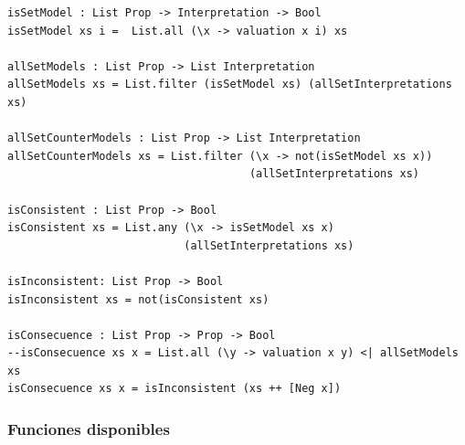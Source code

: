 \documentclass[a4paper]{report}
\begin{document}
\begin{lstlisting}[caption={Módulo SintaxSemanticsLP}, mathescape=true]
isSetModel : List Prop -> Interpretation -> Bool
isSetModel xs i =  List.all (\x -> valuation x i) xs

allSetModels : List Prop -> List Interpretation
allSetModels xs = List.filter (isSetModel xs) (allSetInterpretations xs)

allSetCounterModels : List Prop -> List Interpretation
allSetCounterModels xs = List.filter (\x -> not(isSetModel xs x)) 
                                     (allSetInterpretations xs)

isConsistent : List Prop -> Bool
isConsistent xs = List.any (\x -> isSetModel xs x)
                           (allSetInterpretations xs)

isInconsistent: List Prop -> Bool
isInconsistent xs = not(isConsistent xs)

isConsecuence : List Prop -> Prop -> Bool
--isConsecuence xs x = List.all (\y -> valuation x y) <| allSetModels xs
isConsecuence xs x = isInconsistent (xs ++ [Neg x])
\end{lstlisting}

\subsubsection{Funciones disponibles}
\end{document}
